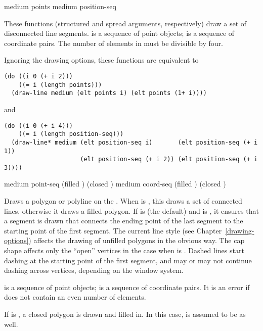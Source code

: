   {medium points \key \DrawingOptions \LineCapOptions}
 {medium position-seq \key \DrawingOptions \LineCapOptions}

These functions (structured and spread arguments, respectively) draw a set of
disconnected line segments.   is a sequence of point objects;
 is a sequence of coordinate pairs.  The number of elements in
 must be divisible by four.

Ignoring the drawing options, these functions are equivalent to
\begin{verbatim}
(do ((i 0 (+ i 2)))
    ((= i (length points)))
  (draw-line medium (elt points i) (elt points (1+ i))))
\end{verbatim}
and
\begin{verbatim}
(do ((i 0 (+ i 4)))
    ((= i (length position-seq)))
  (draw-line* medium (elt position-seq i)       (elt position-seq (+ i 1))
                     (elt position-seq (+ i 2)) (elt position-seq (+ i 3))))
\end{verbatim}


  {medium point-seq \key (filled ) (closed )
                        \DrawingOptions  \LineJointCapOptions}
 {medium coord-seq \key (filled ) (closed )
                        \DrawingOptions \LineJointCapOptions}

Draws a polygon or polyline on the  .  When
 is , this draws a set of connected lines, otherwise it
draws a filled polygon.  If  is  (the default) and
 is , it ensures that a segment is drawn that connects
the ending point of the last segment to the starting point of the first segment.
The current line style (see Chapter~\ref{drawing-options}) affects the drawing
of unfilled polygons in the obvious way.  The cap shape affects only the
``open'' vertices in the case when  is .  Dashed lines
start dashing at the starting point of the first segment, and may or may not
continue dashing across vertices, depending on the window system.

 is a sequence of point objects;  is a sequence of
coordinate pairs.  It is an error if  does not contain an even
number of elements.

If  is , a closed polygon is drawn and filled in.  In
this case,  is assumed to be  as well.


